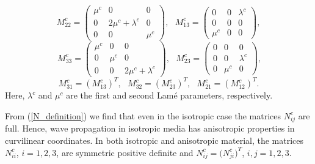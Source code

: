 \begin{equation}\label{M_definition}
M_{22}^c = \left(\begin{array}{ccc}
\mu^c & 0 & 0\\
0 & 2\mu^c+\lambda^c & 0\\
0 & 0 & \mu^c\end{array}\right),\ \ \ M_{13}^c = \left(\begin{array}{ccc}
0 & 0 & \lambda^c\\
0 & 0 & 0\\
\mu^c & 0 & 0\end{array}\right),
\end{equation}
\[\ M_{33}^c = \left(\begin{array}{ccc}
\mu^c & 0 & 0\\
0 & \mu^c & 0\\
0 & 0 & 2\mu^c+\lambda^c\end{array}\right),\ \ \ M_{23}^c = \left(\begin{array}{ccc}
0 & 0 & 0\\
0 & 0 & \lambda^c\\
0 & \mu^c & 0\end{array}\right),\]
\[ M_{31}^c = (M_{13}^c)^T, \ \ \  M_{32}^c =(M_{23}^c)^T, \ \ \ M_{21}^c =(M_{12}^c)^T.\]
Here, $\lambda^c$ and $\mu^c$ are the first and second Lam{\'{e}} parameters, respectively. 

From (\ref{N_definition}) we find that even in the isotropic case the matrices $N_{ij}^c$ are full. Hence, wave propagation in isotropic media has anisotropic properties in curvilinear coordinates. In both isotropic and anisotropic material, the matrices $N_{ii}^c$, $i = 1,2,3$, are symmetric positive definite and $N_{ij}^c=\big(N_{ji}^c\big)^T$, $i,j=1,2,3$. 

